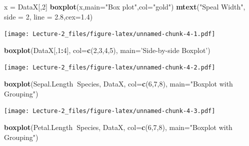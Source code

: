 \documentclass[
]{article}
\newenvironment{Shaded}{\begin{snugshade}}{\end{snugshade}}
\newcommand{\DataTypeTok}[1]{\textcolor[rgb]{0.13,0.29,0.53}{#1}}
\newcommand{\DecValTok}[1]{\textcolor[rgb]{0.00,0.00,0.81}{#1}}
\newcommand{\FloatTok}[1]{\textcolor[rgb]{0.00,0.00,0.81}{#1}}
\newcommand{\KeywordTok}[1]{\textcolor[rgb]{0.13,0.29,0.53}{\textbf{#1}}}
\newcommand{\NormalTok}[1]{#1}
\newcommand{\OperatorTok}[1]{\textcolor[rgb]{0.81,0.36,0.00}{\textbf{#1}}}
\newcommand{\StringTok}[1]{\textcolor[rgb]{0.31,0.60,0.02}{#1}}
\begin{document}
\begin{Shaded}
\begin{Highlighting}[]
\NormalTok{x =}\StringTok{ }\NormalTok{DataX[,}\DecValTok{2}\NormalTok{]}
\KeywordTok{boxplot}\NormalTok{(x,}\DataTypeTok{main=}\StringTok{"Box plot"}\NormalTok{,}\DataTypeTok{col=}\StringTok{"gold"}\NormalTok{)}
\KeywordTok{mtext}\NormalTok{(}\StringTok{"Speal Width"}\NormalTok{, }\DataTypeTok{side =} \DecValTok{2}\NormalTok{, }\DataTypeTok{line =} \FloatTok{2.8}\NormalTok{,}\DataTypeTok{cex=}\FloatTok{1.4}\NormalTok{)}
\end{Highlighting}
\end{Shaded}

\texttt{[image: Lecture-2\_files/figure-latex/unnamed-chunk-4-1.pdf]}

\begin{Shaded}
\begin{Highlighting}[]
\KeywordTok{boxplot}\NormalTok{(DataX[,}\DecValTok{1}\OperatorTok{:}\DecValTok{4}\NormalTok{], }\DataTypeTok{col=}\KeywordTok{c}\NormalTok{(}\DecValTok{2}\NormalTok{,}\DecValTok{3}\NormalTok{,}\DecValTok{4}\NormalTok{,}\DecValTok{5}\NormalTok{), }\DataTypeTok{main=}\StringTok{'Side-by-side Boxplot'}\NormalTok{) }
\end{Highlighting}
\end{Shaded}

\texttt{[image: Lecture-2\_files/figure-latex/unnamed-chunk-4-2.pdf]}

\begin{Shaded}
\begin{Highlighting}[]
\KeywordTok{boxplot}\NormalTok{(Sepal.Length}\OperatorTok{~}\NormalTok{Species, DataX, }\DataTypeTok{col=}\KeywordTok{c}\NormalTok{(}\DecValTok{6}\NormalTok{,}\DecValTok{7}\NormalTok{,}\DecValTok{8}\NormalTok{), }\DataTypeTok{main=}\StringTok{"Boxplot with Grouping"}\NormalTok{)}
\end{Highlighting}
\end{Shaded}

\texttt{[image: Lecture-2\_files/figure-latex/unnamed-chunk-4-3.pdf]}

\begin{Shaded}
\begin{Highlighting}[]
\KeywordTok{boxplot}\NormalTok{(Petal.Length}\OperatorTok{~}\NormalTok{Species, DataX, }\DataTypeTok{col=}\KeywordTok{c}\NormalTok{(}\DecValTok{6}\NormalTok{,}\DecValTok{7}\NormalTok{,}\DecValTok{8}\NormalTok{), }\DataTypeTok{main=}\StringTok{"Boxplot with Grouping"}\NormalTok{)}
\end{Highlighting}
\end{Shaded}
\end{document}
